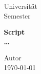 \begin{titlepage}
\begin{small} \vfill {Universität\\ Semester} \end{small}
\begin{center} \begin{Large}\vfill {\textsf{\textbf{Script \\ \dots}}} \end{Large} \end{center}
\begin{small} \vfill Autor\\ \today \end{small}
\end{titlepage}


\tableofcontents


\nocite{*} %

